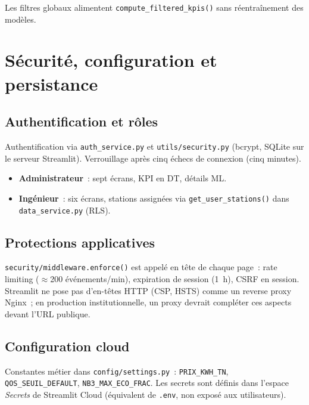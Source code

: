 Les filtres globaux alimentent \texttt{compute\_filtered\_kpis()} sans
réentraînement des modèles.

\section{Sécurité, configuration et persistance}
\label{sec:dep-securite}

\subsection{Authentification et rôles}
\label{subsec:dep-auth}

Authentification via \texttt{auth\_service.py} et \texttt{utils/security.py}
(bcrypt, SQLite sur le serveur Streamlit). Verrouillage après cinq échecs de
connexion (cinq minutes).

\begin{itemize}
  \item \textbf{Administrateur}~: sept écrans, KPI en DT, détails ML.
  \item \textbf{Ingénieur}~: six écrans, stations assignées via
    \texttt{get\_user\_stations()} dans \texttt{data\_service.py} (RLS).
\end{itemize}

\subsection{Protections applicatives}
\label{subsec:dep-middleware}

\texttt{security/middleware.enforce()} est appelé en tête de chaque page~:
rate limiting ($\approx$200 événements/min), expiration de session (1~h), CSRF
en session. Streamlit ne pose pas d'en-têtes HTTP (CSP, HSTS) comme un reverse
proxy Nginx~; en production institutionnelle, un proxy devrait compléter ces
aspects devant l'URL publique.

\subsection{Configuration cloud}
\label{subsec:dep-config}

Constantes métier dans \texttt{config/settings.py}~: \texttt{PRIX\_KWH\_TN},
\texttt{QOS\_SEUIL\_DEFAULT}, \texttt{NB3\_MAX\_ECO\_FRAC}. Les secrets sont
définis dans l'espace \emph{Secrets} de Streamlit Cloud (équivalent de
\texttt{.env}, non exposé aux utilisateurs).

